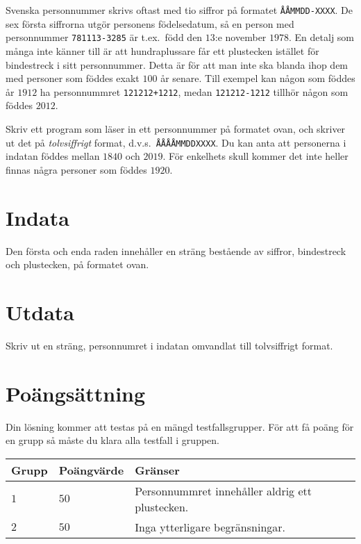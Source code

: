 
Svenska personnummer skrivs oftast med tio siffror på formatet \texttt{ÅÅMMDD-XXXX}. De sex första siffrorna utgör personens födelsedatum, så en
person med personnummer \texttt{781113-3285} är t.ex.\ född den $13$:e november $1978$. En detalj som många
inte känner till är att hundraplussare får ett plustecken istället för bindestreck i sitt 
personnummer. Detta är för att man inte ska blanda ihop dem med personer som föddes exakt $100$
år senare. Till exempel kan någon som föddes år $1912$ ha personnummret \texttt{121212+1212}, medan 
\texttt{121212-1212} tillhör någon som föddes $2012$. 

Skriv ett program som läser in ett personnummer på formatet ovan,
och skriver ut det på \emph{tolvsiffrigt} format, d.v.s.\ \texttt{ÅÅÅÅMMDDXXXX}.
Du kan anta att personerna i indatan föddes mellan $1840$ och $2019$.
För enkelhets skull kommer det inte heller finnas några personer som föddes $1920$. 

\section*{Indata}
Den första och enda raden innehåller en sträng bestående av siffror, bindestreck och plustecken, på formatet ovan.

\section*{Utdata}
Skriv ut en sträng, personnumret i indatan omvandlat till tolvsiffrigt format.

\section*{Poängsättning}
Din lösning kommer att testas på en mängd testfallsgrupper.
För att få poäng för en grupp så måste du klara alla testfall i gruppen.

\noindent
\begin{tabular}{| l | l | l |}
  \hline
  Grupp & Poängvärde & Gränser \\ \hline
  $1$   & $50$       & Personnummret innehåller aldrig ett plustecken. \\ \hline
  $2$   & $50$       & Inga ytterligare begränsningar. \\ \hline
\end{tabular}
